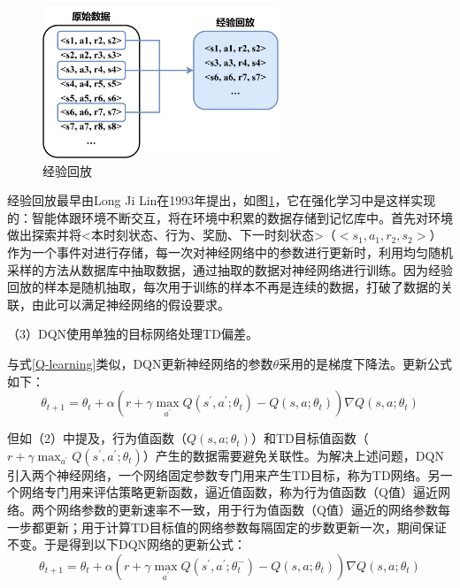 \begin{figure}[htbp]
    \vspace{13pt} %
    \centering
    \includegraphics[width=0.63\textwidth]{images/chapter2/Experience_Replay.png}
    \caption{经验回放}\label{经验回放} %
\end{figure}

经验回放最早由Long Ji Lin在1993年提出\cite{1992Reinforcement}，如图\ref{经验回放}，它在强化学习中是这样实现的：智能体跟环境不断交互，将在环境中积累的数据存储到记忆库中。首先对环境做出探索并将<本时刻状态、行为、奖励、下一时刻状态>（$<s_1, a_1, r_2, s_2>$）作为一个事件对进行存储，每一次对神经网络中的参数进行更新时，利用均匀随机采样的方法从数据库中抽取数据，通过抽取的数据对神经网络进行训练。因为经验回放的样本是随机抽取，每次用于训练的样本不再是连续的数据，打破了数据的关联，由此可以满足神经网络的假设要求。

（3）DQN使用单独的目标网络处理TD偏差。

与式\ref{Q-learning}类似，DQN更新神经网络的参数$\theta$采用的是梯度下降法。更新公式如下：
\begin{equation*}
    \theta_{t+1} = \theta_t + \alpha (r + \gamma \max_{a^{'}} Q(s^{'}, a^{'}; \theta_t) - Q(s, a; \theta_t))\nabla   Q(s, a; \theta_t)
\end{equation*}

但如（2）中提及，行为值函数（$Q(s, a; \theta_t)$）和TD目标值函数（$r + \gamma \max_{a^{'}} Q(s^{'}, a^{'}; \theta_t)$）产生的数据需要避免关联性。为解决上述问题，DQN引入两个神经网络，一个网络固定参数专门用来产生TD目标，称为TD网络。另一个网络专门用来评估策略更新函数，逼近值函数，称为行为值函数（Q值）逼近网络。两个网络参数的更新速率不一致，用于行为值函数（Q值）逼近的网络参数每一步都更新；用于计算TD目标值的网络参数每隔固定的步数更新一次，期间保证不变。于是得到以下DQN网络的更新公式：
\begin{equation}\label{DQN}
    \theta_{t+1} = \theta_t + \alpha (r + \gamma \max_{a^{'}} Q(s^{'}, a^{'}; \theta_t^{-}) - Q(s, a; \theta_t))\nabla   Q(s, a; \theta_t)
\end{equation}

